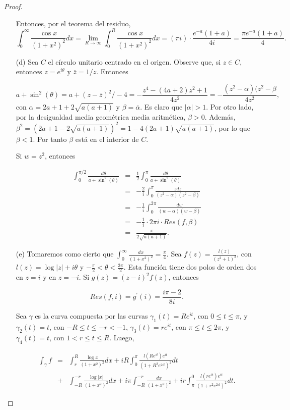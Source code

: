 \documentclass[12pt]{article}
\begin{document}
\begin{proof}
\begin{itemize}
Entonces, por el teorema del residuo, 
$$ \int_0^\infty \frac{\cos x}{(1 +x^2)^2}dx = \lim_{R \to \infty} \int_0^R \frac{\cos x}{(1+x^2)^2} dx = (\pi i) \cdot \frac{e^{-a}(1+a)}{4i} = \frac{\pi e^{-a}(1+a)}{4}.$$

\item[(d)] Sea $C$ el círculo unitario centrado en el origen. Observe que, si $z \in C$, entonces $z = e^{i \theta}$ y $\overline{z} = 1/z$. Entonces

$$a+ \sin^2(\theta) = a + (z - \overline{z})^2/-4 = - \frac{z^4 - (4a+2)z^2 + 1}{4z^2} = - \frac{(z^2 - \alpha)(z^2-\beta}{4z^2},$$
con $\alpha = 2a + 1 + 2 \sqrt{a(a+1)}$ y $\beta = \overline{\alpha}.$ Es claro que $\lvert \alpha \rvert > 1$. Por otro lado, por la desigualdad media geométrica  media aritmética, $\beta > 0$. Además, $\beta^2 = (2a+1- 2 \sqrt{a(a+1)})^2 = 1 - 4(2a+1)\sqrt{a(a+1)}$, por lo que $\beta < 1.$ Por tanto $\beta$ está en el interior de $C.$

Si $w = z^2$, entonces

\begin{eqnarray*}
\int_0^{\pi/2} \frac{d\theta}{a + \sin^2(\theta)} &=& \frac{1}{2}\int_0^{\pi} \frac{d\theta}{a + \sin^2(\theta)}\\
&=& - \frac{2}{i} \int_0^{\pi} \frac{z dz}{(z^2 - \alpha)(z^2-\beta)}\\
&=& -\frac{1}{i} \int_0^{2 \pi} \frac{dw}{(w-\alpha)(w - \beta)}\\
&=&  - \frac{1}{i} \cdot 2 \pi i \cdot Res(f, \beta) \\
&=& \frac{\pi}{2 \sqrt{a(a+1)}}.
\end{eqnarray*}

\item[(e)] Tomaremos como cierto que  $\int_0^\infty \frac{dx}{(1+x^2)^2} = \frac{\pi}{4}$. Sea $f(z) = \frac{l(z)}{(z^2 +1)^2}$, con $l(z) = \log \lvert z \rvert + i \theta$ y $- \frac{\pi}{2} < \theta < \frac{3\pi}{2}$. Esta función tiene dos polos de orden dos en $z=i$ y en $z=-i.$ Si $g(z) = (z-i)^2 f(z)$, entonces

$$Res(f, i) = g^\prime(i) = \frac{i\pi - 2}{8i}.$$

Sea $\gamma$ es la curva compuesta por las curvas $\gamma_1(t) = R e^{it}$, con $0 \leq t \leq \pi$, y $\gamma_2(t) = t$, con $- R \leq t \leq -r < -1$, $\gamma_3(t) = r e^{it}$, con $\pi \leq t \leq 2\pi$, y $\gamma_4(t) = t$, con $1 < r\leq t \leq R.$ Luego,

\begin{eqnarray*}
\int_\gamma f &=& \int_r^R \frac{\log x}{(1+x^2)^2}dx + iR \int_0^\pi \frac{l(Re^{it}) e^{it}}{(1 + R^2 e^{2it})^2} dt\\ &+& \int_{-R}^{-r} \frac{\log \lvert x \rvert }{(1+x^2)^2} dx + i \pi \int_{-R}^{-r} \frac{dx}{(1+x^2)^2} + ir \int_{\pi}^0 \frac{l(re^{it}) e^{it}}{(1+r^2 e^{2it})^2}dt.
\end{eqnarray*}


\end{itemize}
\end{proof}
\end{document}
